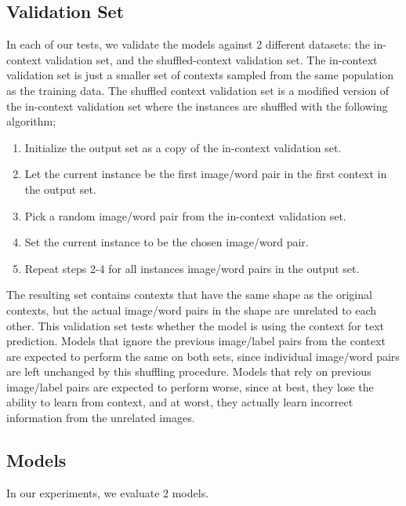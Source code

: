 \subsection{Validation Set}
In each of our tests, we validate the models against 2 different datasets: the
in-context validation set, and the shuffled-context validation set.
The in-context validation set is just a smaller set of contexts sampled from the
same population as the training data.
The shuffled context validation set is a modified version of the in-context
validation set where the instances are shuffled with the following algorithm;
\begin{enumerate}
    \item Initialize the output set as a copy of the in-context validation set.
    \item Let the current instance be the first image/word pair in the first
        context in the output set.
    \item Pick a random image/word pair from the in-context validation set.
    \item Set the current instance to be the chosen image/word pair.
    \item Repeat steps 2-4 for all instances image/word pairs in the output set.
\end{enumerate}
The resulting set contains contexts that have the same shape as the original
contexts, but the actual image/word pairs in the shape are unrelated to each
other.
This validation set tests whether the model is using the context for text
prediction.
Models that ignore the previous image/label pairs from the context are expected
to perform the same on both sets, since individual image/word pairs are left
unchanged by this shuffling procedure.
Models that rely on previous image/label pairs are expected to perform worse,
since at best, they lose the ability to learn from context, and at worst, they
actually learn incorrect information from the unrelated images.

\subsection{Models}
In our experiments, we evaluate 2 models.

